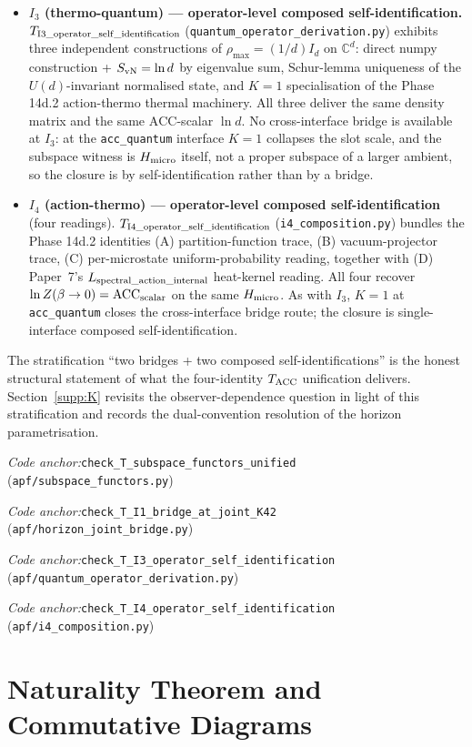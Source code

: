\documentclass[11pt]{article}
\theoremstyle{plain}
\theoremstyle{definition}
\theoremstyle{remark}
\newcommand{\coderef}[2]{\par\noindent\textit{Code anchor:}\quad\texttt{#1} (\texttt{#2})}
\begin{document}
\begin{itemize}[leftmargin=2.5em]
  \item \textbf{$I_3$ (thermo-quantum) --- operator-level composed self-identification.}  $T_{\rm I3\_operator\_self\_identification}$ (\texttt{quantum\_operator\_derivation.py}) exhibits three independent constructions of $\rho_{\max} = (1/d) I_d$ on $\mathbb{C}^d$: direct numpy construction + $S_{\rm vN} = \ln d$ by eigenvalue sum, Schur-lemma uniqueness of the $U(d)$-invariant normalised state, and $K = 1$ specialisation of the Phase 14d.2 action-thermo thermal machinery.  All three deliver the same density matrix and the same $\mathrm{ACC}$-scalar $\ln d$.  No cross-interface bridge is available at $I_3$: at the \texttt{acc\_quantum} interface $K = 1$ collapses the slot scale, and the subspace witness is $H_{\rm micro}$ itself, not a proper subspace of a larger ambient, so the closure is by self-identification rather than by a bridge.
  \item \textbf{$I_4$ (action-thermo) --- operator-level composed self-identification} (four readings).  $T_{\rm I4\_operator\_self\_identification}$ (\texttt{i4\_composition.py}) bundles the Phase 14d.2 identities (A) partition-function trace, (B) vacuum-projector trace, (C) per-microstate uniform-probability reading, together with (D) Paper~7's $L_{\rm spectral\_action\_internal}$ heat-kernel reading.  All four recover $\ln Z(\beta \to 0) = \mathrm{ACC}_{\rm scalar}$ on the same $H_{\rm micro}$.  As with $I_3$, $K = 1$ at \texttt{acc\_quantum} closes the cross-interface bridge route; the closure is single-interface composed self-identification.
\end{itemize}

\noindent The stratification ``two bridges + two composed self-identifications'' is the honest structural statement of what the four-identity $T_{\rm ACC}$ unification delivers.  Section~\ref{supp:K} revisits the observer-dependence question in light of this stratification and records the dual-convention resolution of the horizon parametrisation.

\coderef{check\_T\_subspace\_functors\_unified}{apf/subspace\_functors.py}
\coderef{check\_T\_I1\_bridge\_at\_joint\_K42}{apf/horizon\_joint\_bridge.py}
\coderef{check\_T\_I3\_operator\_self\_identification}{apf/quantum\_operator\_derivation.py}
\coderef{check\_T\_I4\_operator\_self\_identification}{apf/i4\_composition.py}

\section{Naturality Theorem and Commutative Diagrams}\label{supp:F}
\end{document}

